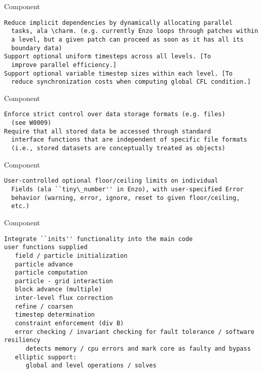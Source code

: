\documentclass{article}
\begin{document}
 Component

\begin{verbatim}
Reduce implicit dependencies by dynamically allocating parallel
  tasks, ala \charm. (e.g. currently Enzo loops through patches within
  a level, but a given patch can proceed as soon as it has all its
  boundary data)
Support optional uniform timesteps across all levels. [To
  improve parallel efficiency.]
Support optional variable timestep sizes within each level. [To
  reduce synchronization costs when computing global CFL condition.]
\end{verbatim}

 Component

\begin{verbatim}
Enforce strict control over data storage formats (e.g. files)
  (see W0009)
Require that all stored data be accessed through standard
  interface functions that are independent of specific file formats
  (i.e., stored datasets are conceptually treated as objects)
\end{verbatim}

 Component

\begin{verbatim}
User-controlled optional floor/ceiling limits on individual
  Fields (ala ``tiny\_number'' in Enzo), with user-specified Error
  behavior (warning, error, ignore, reset to given floor/ceiling,
  etc.)
\end{verbatim}

 Component

\begin{verbatim}
Integrate ``inits'' functionality into the main code
user functions supplied
   field / particle initialization
   particle advance
   particle computation
   particle - grid interaction
   block advance (multiple)
   inter-level flux correction
   refine / coarsen
   timestep determination
   constraint enforcement (div B)
   error checking / invariant checking for fault tolerance / software resiliency
      detects memory / cpu errors and mark core as faulty and bypass
   elliptic support:
      global and level operations / solves
\end{verbatim}
\end{document}
